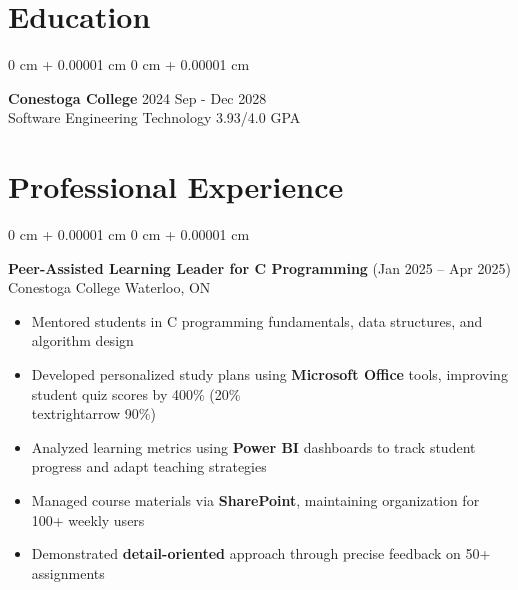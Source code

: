 \documentclass[11pt]{article}
\newenvironment{highlights}{
    \begin{itemize}[
        topsep=0.10 cm,
        parsep=0.10 cm,
        partopsep=0pt,
        itemsep=0pt,
        leftmargin=0 cm + 10pt
    ]
}{
    \end{itemize}
}
\newenvironment{onecolentry}{
    \begin{adjustwidth}{
        0 cm + 0.00001 cm
    }{
        0 cm + 0.00001 cm
    }
}{
    \end{adjustwidth}
}
\begin{document}
\vspace{-8pt}
\section{Education}
\vspace{-13pt}
\hrulefill
\vspace{+3pt}
\begin{onecolentry}
 {\normalsize \textbf{Conestoga College}} \hfill {2024 Sep - Dec 2028}\\
 \vspace{+3pt}
 {Software Engineering Technology} \hfill {3.93/4.0 GPA}\\
 
\end{onecolentry}

\section{Professional Experience}
\vspace{-12pt}
\hrulefill
\begin{onecolentry}
    {\normalsize \textbf{Peer-Assisted Learning Leader for C Programming}} \hfill {(Jan 2025 – Apr 2025)}\\
    {Conestoga College} \hfill {Waterloo, ON}\\
    \begin{highlights}
        \item Mentored students in C programming fundamentals, data structures, and algorithm design
        \item Developed personalized study plans using \textbf{Microsoft Office} tools, improving student quiz scores by 400\% (20\% \\textrightarrow{} 90\%)
        \item Analyzed learning metrics using \textbf{Power BI} dashboards to track student progress and adapt teaching strategies
        \item Managed course materials via \textbf{SharePoint}, maintaining organization for 100+ weekly users
        \item Demonstrated \textbf{detail-oriented} approach through precise feedback on 50+ assignments
    \end{highlights}
\end{onecolentry}
\end{document}

